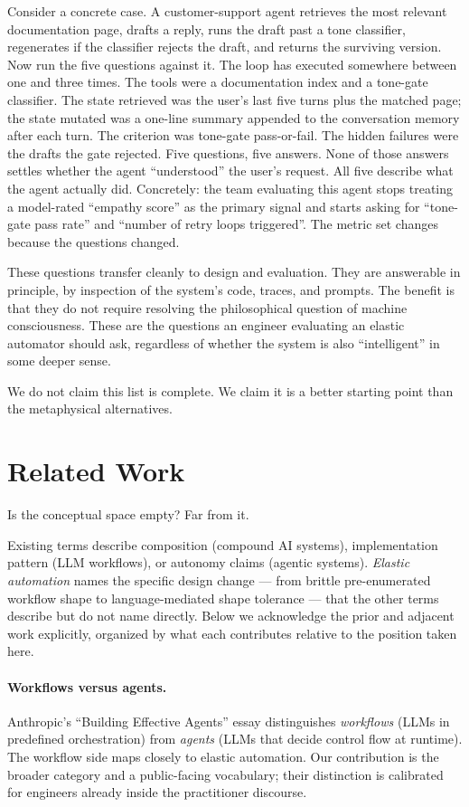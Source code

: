 \documentclass[11pt,a4paper]{article}
\begin{document}
Consider a concrete case. A customer-support agent retrieves the most relevant documentation page, drafts a reply, runs the draft past a tone classifier, regenerates if the classifier rejects the draft, and returns the surviving version. Now run the five questions against it. The loop has executed somewhere between one and three times. The tools were a documentation index and a tone-gate classifier. The state retrieved was the user's last five turns plus the matched page; the state mutated was a one-line summary appended to the conversation memory after each turn. The criterion was tone-gate pass-or-fail. The hidden failures were the drafts the gate rejected. Five questions, five answers. None of those answers settles whether the agent ``understood'' the user's request. All five describe what the agent actually did. Concretely: the team evaluating this agent stops treating a model-rated ``empathy score'' as the primary signal and starts asking for ``tone-gate pass rate'' and ``number of retry loops triggered''. The metric set changes because the questions changed.

These questions transfer cleanly to design and evaluation. They are answerable in principle, by inspection of the system's code, traces, and prompts. The benefit is that they do not require resolving the philosophical question of machine consciousness. These are the questions an engineer evaluating an elastic automator should ask, regardless of whether the system is also ``intelligent'' in some deeper sense.

We do not claim this list is complete. We claim it is a better starting point than the metaphysical alternatives.

\section{Related Work}\label{sec:related-work}

Is the conceptual space empty? Far from it.

Existing terms describe composition (compound AI systems), implementation pattern (LLM workflows), or autonomy claims (agentic systems). \textit{Elastic automation} names the specific design change --- from brittle pre-enumerated workflow shape to language-mediated shape tolerance --- that the other terms describe but do not name directly. Below we acknowledge the prior and adjacent work explicitly, organized by what each contributes relative to the position taken here.

\paragraph{Workflows versus agents.} Anthropic's ``Building Effective Agents'' essay \citep{anthropic2024agents} distinguishes \textit{workflows} (LLMs in predefined orchestration) from \textit{agents} (LLMs that decide control flow at runtime). The workflow side maps closely to elastic automation. Our contribution is the broader category and a public-facing vocabulary; their distinction is calibrated for engineers already inside the practitioner discourse.
\end{document}

